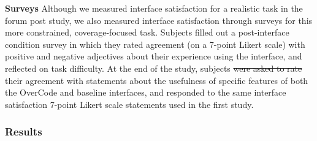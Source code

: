 \documentclass[12pt,twoside]{mitthesis}
\providecommand{\DIFaddtex}[1]{{\protect\color{blue}\uwave{#1}}} %
\providecommand{\DIFdeltex}[1]{{\protect\color{red}\sout{#1}}}                      %
\providecommand{\DIFaddbegin}{} %
\providecommand{\DIFaddend}{} %
\providecommand{\DIFdelbegin}{} %
\providecommand{\DIFdelend}{} %
\providecommand{\DIFadd}[1]{\texorpdfstring{\DIFaddtex{#1}}{#1}} %
\providecommand{\DIFdel}[1]{\texorpdfstring{\DIFdeltex{#1}}{}} %
\begin{document}
{\bf Surveys} Although we measured interface satisfaction for a realistic task in the forum post study, we also measured interface satisfaction through surveys for this more constrained, coverage-focused task. Subjects filled out a post-interface condition survey in which they rated agreement (on a 7-point Likert scale) with positive and negative adjectives about their experience using the interface, and reflected on task difficulty. At the end of the study, subjects \DIFdelbegin \DIFdel{were asked to rate }\DIFdelend \DIFaddbegin \DIFadd{rated }\DIFaddend their agreement with statements about the usefulness of specific features of both the OverCode and baseline interfaces, and responded to the same interface satisfaction 7-point Likert scale statements used in the first study.

\subsubsection{Results} \label{coverageResults}
\end{document}
